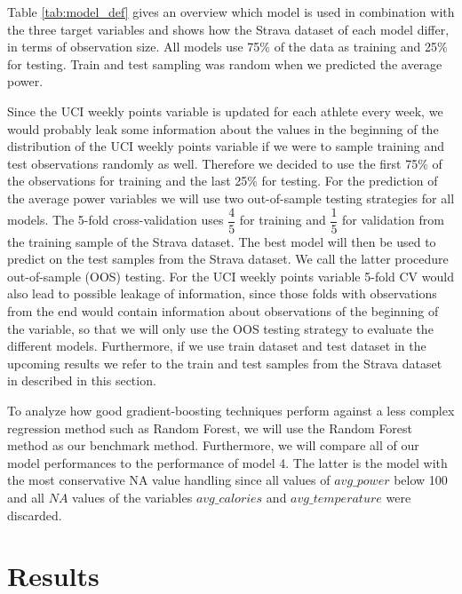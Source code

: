 \documentclass[12pt,a4paper]{article}
\begin{document}
Table \ref{tab:model_def} gives an overview which model is used in combination with the three target variables and shows how the Strava dataset of each model differ, in terms of observation size. All models use 75\% of the data as training and 25\% for testing. Train and test sampling was random when we predicted the average power.

Since the UCI weekly points variable is updated for each athlete every week, we would probably leak some information about the values in the beginning of the distribution of the UCI weekly points variable if we were to sample training and test observations randomly as well. Therefore we decided to use the first 75\% of the observations for training and the last 25\% for testing. For the prediction of the average power variables we will use two out-of-sample testing strategies for all models. The 5-fold cross-validation uses \(\dfrac{4}{5}\) for training and \(\dfrac{1}{5}\) for validation from the training sample of the Strava dataset. The best model will then be used to predict on the test samples from the Strava dataset. We call the latter procedure out-of-sample (OOS) testing. For the UCI weekly points variable 5-fold CV would also lead to possible leakage of information, since those folds with observations from the end would contain information about observations of the beginning of the variable, so that we will only use the OOS testing strategy to evaluate the different models. Furthermore, if we use train dataset and test dataset in the upcoming results we refer to the train and test samples from the Strava dataset in described in this section.

To analyze how good gradient-boosting techniques perform against a less complex regression method such as Random Forest, we will use the Random Forest method as our benchmark method. Furthermore, we will compare all of our model performances to the performance of model 4. The latter is the model with the most conservative NA value handling since all values of \(avg\_power\) below 100 and all \(NA\) values of the variables \(avg\_calories\) and \(avg\_temperature\) were discarded.

\hypertarget{results}{%
\section{\texorpdfstring{Results \label{sec:results}}{Results }}\label{results}}
\end{document}
